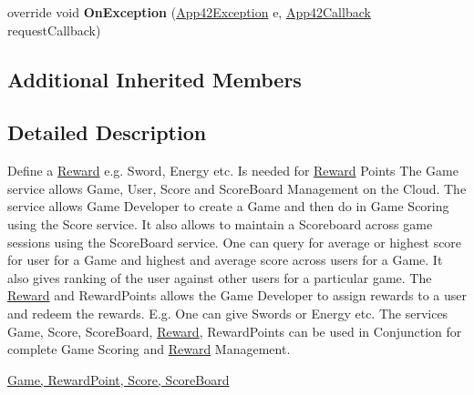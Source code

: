 \begin{DoxyCompactItemize}
\item 
\hypertarget{classcom_1_1shephertz_1_1app42_1_1paas_1_1sdk_1_1windows_1_1reward_1_1_reward_service_a7e065cd214a08469d0f7b8fab959dd9f}{override void {\bfseries On\+Exception} (\hyperlink{classcom_1_1shephertz_1_1app42_1_1paas_1_1sdk_1_1windows_1_1_app42_exception}{App42\+Exception} e, \hyperlink{interfacecom_1_1shephertz_1_1app42_1_1paas_1_1sdk_1_1windows_1_1_app42_callback}{App42\+Callback} request\+Callback)}\label{classcom_1_1shephertz_1_1app42_1_1paas_1_1sdk_1_1windows_1_1reward_1_1_reward_service_a7e065cd214a08469d0f7b8fab959dd9f}

\end{DoxyCompactItemize}
\subsection*{Additional Inherited Members}


\subsection{Detailed Description}
Define a \hyperlink{classcom_1_1shephertz_1_1app42_1_1paas_1_1sdk_1_1windows_1_1reward_1_1_reward}{Reward} e.\+g. Sword, Energy etc. Is needed for \hyperlink{classcom_1_1shephertz_1_1app42_1_1paas_1_1sdk_1_1windows_1_1reward_1_1_reward}{Reward} Points The Game service allows Game, User, Score and Score\+Board Management on the Cloud. The service allows Game Developer to create a Game and then do in Game Scoring using the Score service. It also allows to maintain a Scoreboard across game sessions using the Score\+Board service. One can query for average or highest score for user for a Game and highest and average score across users for a Game. It also gives ranking of the user against other users for a particular game. The \hyperlink{classcom_1_1shephertz_1_1app42_1_1paas_1_1sdk_1_1windows_1_1reward_1_1_reward}{Reward} and Reward\+Points allows the Game Developer to assign rewards to a user and redeem the rewards. E.\+g. One can give Swords or Energy etc. The services Game, Score, Score\+Board, \hyperlink{classcom_1_1shephertz_1_1app42_1_1paas_1_1sdk_1_1windows_1_1reward_1_1_reward}{Reward}, Reward\+Points can be used in Conjunction for complete Game Scoring and \hyperlink{classcom_1_1shephertz_1_1app42_1_1paas_1_1sdk_1_1windows_1_1reward_1_1_reward}{Reward} Management. 

\hyperlink{classcom_1_1shephertz_1_1app42_1_1paas_1_1sdk_1_1windows_1_1reward_1_1_reward_service}{Game, Reward\+Point, Score, Score\+Board} 

